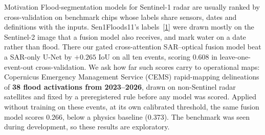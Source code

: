 \documentclass[10pt,twocolumn,a4paper]{article}
\makeatletter
\newcommand{\refn}[2]{\hyperref[ref:#1]{#2}}
\renewcommand\section{\@startsection{section}{1}{\z@}{-1.1ex \@plus -.3ex \@minus -.2ex}{0.5ex \@plus .2ex}%
  {\normalfont\large\bfseries}}
\makeatother
\begin{document}

\section{Motivation}\label{sec:motivation}
Flood-segmentation models for Sentinel-1 radar are usually ranked by cross-validation on benchmark chips whose labels
share sensors, dates and definitions with the inputs. Sen1Floods11's labels~[\refn{bonafilia2020sen1floods11}{1}] were
drawn mostly on the Sentinel-2 image that a fusion model also receives, and mark water on a date rather than flood.
There our gated cross-attention SAR--optical fusion model beat a SAR-only U-Net by $+0.265$ IoU on all ten events,
scoring 0.608 in leave-one-event-out cross-validation. We ask how far such scores carry to operational maps:
Copernicus Emergency Management Service (CEMS) rapid-mapping delineations of \textbf{38 flood activations from
2023--2026}, drawn on non-Sentinel radar satellites and fixed by a
preregistered rule before any model was scored. Applied without training on these events, at its own calibrated
threshold, the same fusion model scores 0.266, below a physics baseline (0.373). The benchmark was seen during
development, so these results are exploratory.
\end{document}
